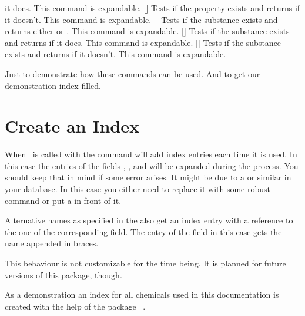 \documentclass[load-preamble+]{cnltx-doc}
\begin{document}
\begin{commands}
    it does. This command is expandable.
  \expandable{}[]
    Tests if the property  exists and returns  if
    it doesn't. This command is expandable.
  \expandable{}[]
    Tests if the substance  exists and returns either  or . This command is expandable.
  \expandable{}[]
    Tests if the substance  exists and returns  if
    it does. This command is expandable.
  \expandable{}[]
    Tests if the substance  exists and returns  if
    it doesn't. This command is expandable.
\end{commands}

\begin{example}
  Just to demonstrate how these commands can be used. And to get
  our demonstration index filled.\par
\end{example}

\section{Create an Index}\label{sec:index}
When \substances\ is called with  the command 
will add index entries each time it is used. In this case the entries of the
fields , ,  and  will be
expanded during the process. You should keep that in mind if some error
arises. It might be due to a  or similar in your database. In this
case you either need to replace it with some robust command or put a
 in front of it.

Alternative names as specified in the  also get an index entry
with a reference to the one of the corresponding  field. The
entry of the  field in this case gets the  name
appended in braces.

This behaviour is not customizable for the time being. It is planned for future
versions of this package, though.

As a demonstration an index for all chemicals used in this documentation is
created with the help of the package ~\cite{pkg:imakeidx}.
\end{document}
